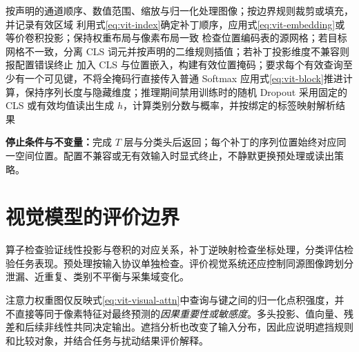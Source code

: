 \documentclass[../textbook.tex]{subfiles}
\begin{document}
\begin{algorithm}[视觉编码的确定性推理路径]
\begin{myalgorithmic}[1]
 \State 按声明的通道顺序、数值范围、缩放与归一化处理图像；按边界规则裁剪或填充，并记录有效区域
 \State 利用式\eqref{eq:vit-index}确定补丁顺序，应用式\eqref{eq:vit-embedding}或等价卷积投影；保持权重布局与像素布局一致
 \State 检查位置编码表的源网格；若目标网格不一致，分离 CLS 词元并按声明的二维规则插值；若补丁投影维度不兼容则报配置错误终止
 \State 加入 CLS 与位置嵌入，构建有效位置掩码；要求每个有效查询至少有一个可见键，不将全掩码行直接传入普通 Softmax
   \State 应用式\eqref{eq:vit-block}推进计算，保持序列长度与隐藏维度；推理期间禁用训练时的随机 Dropout
 \EndFor
 \State 采用固定的 CLS 或有效均值读出生成 $h$，计算类别分数与概率，并按绑定的标签映射解析结果
\end{myalgorithmic}
\textbf{停止条件与不变量：}完成 $T$ 层与分类头后返回；每个补丁的序列位置始终对应同一空间位置。配置不兼容或无有效输入时显式终止，不静默更换预处理或读出策略。
\end{algorithm}

\section{视觉模型的评价边界}

算子检查验证线性投影与卷积的对应关系，补丁逆映射检查坐标处理，分类评估检验任务表现。预处理按输入协议单独检查。评价视觉系统还应控制同源图像跨划分泄漏、近重复、类别不平衡与采集域变化。

注意力权重图仅反映式\eqref{eq:vit-visual-attn}中查询与键之间的归一化点积强度，并不直接等同于像素特征对最终预测的\emph{因果重要性或敏感度}。多头投影、值向量、残差和后续非线性共同决定输出。遮挡分析也改变了输入分布，因此应说明遮挡规则和比较对象，并结合任务与扰动结果评价解释。




\chapterreferences
\myendchapterdocument
\end{document}

